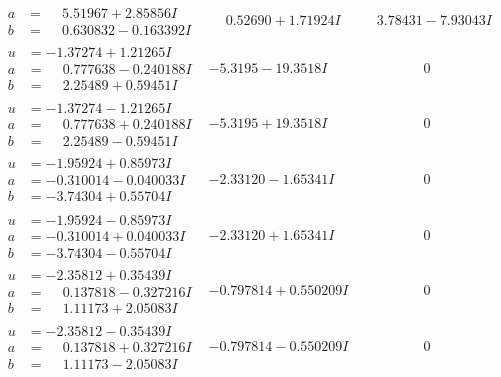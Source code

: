 \documentclass[1p]{elsarticle_modified}
\theoremstyle{definition}
\begin{document}
$$\begin{array}{c|c|c}
\begin{aligned}
a &= \phantom{-}5.51967 + 2.85856 I \\
b &= \phantom{-}0.630832 - 0.163392 I\end{aligned}
 & \phantom{-}0.52690 + 1.71924 I & \phantom{-}3.78431 - 7.93043 I \\ \hline\begin{aligned}
u &= -1.37274 + 1.21265 I \\
a &= \phantom{-}0.777638 - 0.240188 I \\
b &= \phantom{-}2.25489 + 0.59451 I\end{aligned}
 & -5.3195 - 19.3518 I & \phantom{-0.000000 } 0 \\ \hline\begin{aligned}
u &= -1.37274 - 1.21265 I \\
a &= \phantom{-}0.777638 + 0.240188 I \\
b &= \phantom{-}2.25489 - 0.59451 I\end{aligned}
 & -5.3195 + 19.3518 I & \phantom{-0.000000 } 0 \\ \hline\begin{aligned}
u &= -1.95924 + 0.85973 I \\
a &= -0.310014 - 0.040033 I \\
b &= -3.74304 + 0.55704 I\end{aligned}
 & -2.33120 - 1.65341 I & \phantom{-0.000000 } 0 \\ \hline\begin{aligned}
u &= -1.95924 - 0.85973 I \\
a &= -0.310014 + 0.040033 I \\
b &= -3.74304 - 0.55704 I\end{aligned}
 & -2.33120 + 1.65341 I & \phantom{-0.000000 } 0 \\ \hline\begin{aligned}
u &= -2.35812 + 0.35439 I \\
a &= \phantom{-}0.137818 - 0.327216 I \\
b &= \phantom{-}1.11173 + 2.05083 I\end{aligned}
 & -0.797814 + 0.550209 I & \phantom{-0.000000 } 0 \\ \hline\begin{aligned}
u &= -2.35812 - 0.35439 I \\
a &= \phantom{-}0.137818 + 0.327216 I \\
b &= \phantom{-}1.11173 - 2.05083 I\end{aligned}
 & -0.797814 - 0.550209 I & \phantom{-0.000000 } 0 \\ \hline\begin{aligned}

\end{aligned}
\end{array}$$
\end{document}
